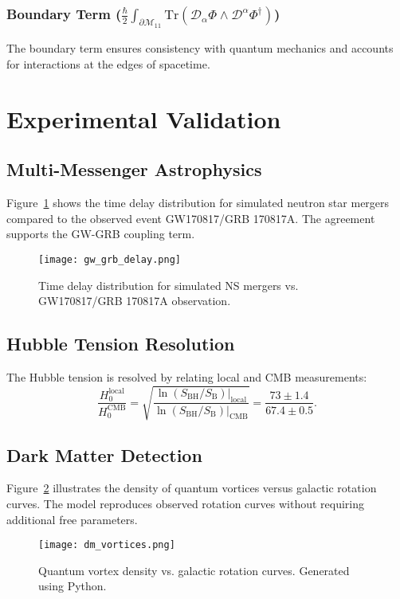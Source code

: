 \documentclass[12pt, a4paper]{article}
\begin{document}
\subsubsection{Boundary Term ($\frac{\hbar}{2} \int_{\partial\mathcal{M}_{11}} \text{Tr}\left( \mathcal{D}_\alpha \Phi \wedge \mathcal{D}^\alpha \Phi^\dagger \right)$)}
The boundary term ensures consistency with quantum mechanics and accounts for interactions at the edges of spacetime.

\section{Experimental Validation}
\subsection{Multi-Messenger Astrophysics}
Figure~\ref{fig:gw_grb_delay} shows the time delay distribution for simulated neutron star mergers compared to the observed event GW170817/GRB 170817A. The agreement supports the GW-GRB coupling term. \\
\begin{figure}[H]
\centering
\texttt{[image: gw\_grb\_delay.png]}
\caption{Time delay distribution for simulated NS mergers vs. GW170817/GRB 170817A observation.}
\label{fig:gw_grb_delay}
\end{figure}

\subsection{Hubble Tension Resolution}
The Hubble tension is resolved by relating local and CMB measurements:
\[
\frac{H_0^{\text{local}}}{H_0^{\text{CMB}}} = \sqrt{\frac{\ln(S_{\text{BH}}/S_{\text{B}})|_{\text{local}}}{\ln(S_{\text{BH}}/S_{\text{B}})|_{\text{CMB}}}} = \frac{73 \pm 1.4}{67.4 \pm 0.5}.
\]

\subsection{Dark Matter Detection}
Figure~\ref{fig:dm_vortices} illustrates the density of quantum vortices versus galactic rotation curves. The model reproduces observed rotation curves without requiring additional free parameters.\linebreak 
\begin{figure}[H]
\centering
\texttt{[image: dm\_vortices.png]}
\caption{Quantum vortex density vs. galactic rotation curves. Generated using Python.}
\label{fig:dm_vortices}
\end{figure}
\end{document}
